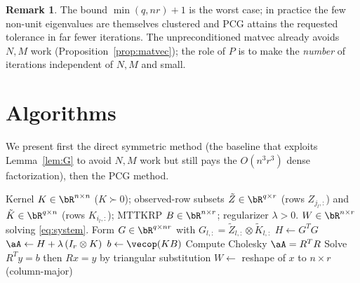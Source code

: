 \documentclass[12pt]{article}
\theoremstyle{definition}
\newtheorem{remark}{Remark}
\begin{document}
\begin{remark}
The bound $\min(q,nr)+1$ is the worst case; in practice the few non-unit
eigenvalues are themselves clustered and PCG attains the requested tolerance in
far fewer iterations. The unpreconditioned matvec already avoids $N,M$ work
(Proposition~\ref{prop:matvec}); the role of $P$ is to make the
\emph{number} of iterations independent of $N,M$ and small.
\end{remark}

\section{Algorithms}

We present first the direct symmetric method (the baseline that exploits
Lemma~\ref{lem:G} to avoid $N,M$ work but still pays the $O(n^3r^3)$ dense
factorization), then the PCG method.

\begin{algorithm}[h]
\caption{Direct symmetric solve for the mode-$k$ RKHS subproblem}
\label{alg:direct}
\begin{algorithmic}[1]
\Require Kernel $K\in\bR^{n\times n}$ ($K\succ0$); observed-row subsets
$\tilde Z\in\bR^{q\times r}$ (rows $Z_{j_l,:}$) and $\tilde K\in\bR^{q\times n}$
(rows $K_{i_l,:}$); MTTKRP $B\in\bR^{n\times r}$; regularizer $\lambda>0$.
\Ensure $W\in\bR^{n\times r}$ solving \eqref{eq:system}.
\State Form $G\in\bR^{q\times nr}$ with $G_{l,:}=\tilde Z_{l,:}\otimes\tilde K_{l,:}$
\State $H\gets G^{T}G$ 
\State $\aA\gets H+\lambda\,(I_r\otimes K)$ 
\State $b\gets \vecop(KB)$ 
\State Compute Cholesky $\aA=R^{T}R$ 
\State Solve $R^{T}y=b$ then $Rx=y$ by triangular substitution 
\State \Return $W\gets$ reshape of $x$ to $n\times r$ (column-major)
\end{algorithmic}
\end{algorithm}
\end{document}
